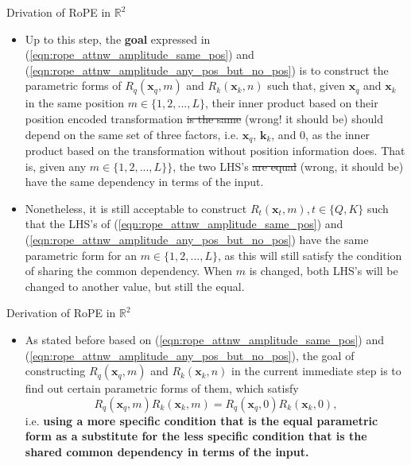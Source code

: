 \documentclass{beamer}
\begin{document}
	\begin{frame}{Drivation of RoPE in $\mathbb{R}^2$}
		\begin{itemize}		
			\item Up to this step, the \textbf{goal} expressed in (\ref{eqn:rope_attnw_amplitude_same_pos}) and (\ref{eqn:rope_attnw_amplitude_any_pos_but_no_pos}) is to construct the parametric forms of $R_q(\mathbf{x}_q, m)$ and $R_k(\mathbf{x}_k, n)$ such that, given $\mathbf{x}_q$ and $\mathbf{x}_k$ in the same position $m \in\{1,2,...,L\}$, their inner product based on their position encoded transformation \sout{is the same} (wrong! it should be) should depend on the same set of three factors, i.e. $\mathbf{x}_q$, $\mathbf{k}_k$, and $0$, as the inner product based on the transformation without position information does. That is, given any $m \in \{1,2,...,L\}\}$, the two LHS's \sout{are equal} (wrong, it should be) have the same dependency in terms of the input. 
			\item Nonetheless, it is still acceptable to construct $R_t(\mathbf{x}_t, m), t\in \{Q,K\}$ such that the LHS's of (\ref{eqn:rope_attnw_amplitude_same_pos}) and (\ref{eqn:rope_attnw_amplitude_any_pos_but_no_pos}) have the same parametric form for an $m\in\{1,2,...,L\}$, as this will still satisfy the condition of sharing the common dependency. When $m$ is changed, both LHS's will be changed to another value, but still the equal.
		\end{itemize}		
	\end{frame}
	
	\begin{frame}{Derivation of RoPE in $\mathbb{R}^2$}
		\begin{itemize}
			\item As stated before based on (\ref{eqn:rope_attnw_amplitude_same_pos}) and (\ref{eqn:rope_attnw_amplitude_any_pos_but_no_pos}), the goal of constructing $R_q(\mathbf{x}_q, m)$ and $R_k(\mathbf{x}_k, n)$ in the current immediate step is to find out certain parametric forms of them, which satisfy
			\begin{equation}\label{eqn:rope_cond_amplitude_withpos_withoutpos_equal}
				R_q(\mathbf{x}_q, m)R_k(\mathbf{x}_k, m) = R_q(\mathbf{x}_q, 0)R_k(\mathbf{x}_k, 0),
			\end{equation}
			i.e. \textbf{using a more specific condition that is the equal parametric form as a substitute for the less specific condition that is the shared common dependency in terms of the input.}			
		\end{itemize}		
	\end{frame}
	
\end{document}
